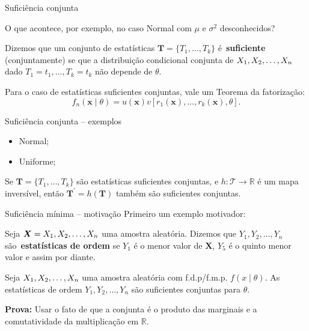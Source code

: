 \begin{frame}{Suficiência conjunta}

O que acontece, por exemplo, no caso Normal com $\mu$ e $\sigma^2$ desconhecidos?

 \begin{defn}
  \label{def:jointly_sufficient}
  Dizemos que  um conjunto de estatísticas $\boldsymbol{T} = \{T_1, \ldots, T_k \}$ é~\textbf{suficiente} (conjuntamente) se que a distribuição condicional conjunta de $X_1, X_2, \ldots, X_n$ dado $T_1 = t_1, \ldots, T_k = t_k$ não depende de $\theta$.  
 \end{defn}
 \begin{obs}
  Para o caso de estatísticas suficientes conjuntas, vale um Teorema da fatorização:
  \begin{equation*}
 f_n(\boldsymbol{x} \mid \theta) = u(\boldsymbol{x}) v[r_1(\boldsymbol{x}), \ldots, r_k(\boldsymbol{x}), \theta].
\end{equation*}
 \end{obs}

\end{frame}

\begin{frame}{Suficiência conjunta -- exemplos}
 \begin{itemize}
  \item Normal;
  \item Uniforme;
 \end{itemize}

  \begin{obs}
    Se $\boldsymbol{T} =  \{T_1, \ldots, T_k \}$ são estatísticas suficientes conjuntas, e $h : \mathcal{T} \to \mathbb{R}$ é um mapa inversível, então $\boldsymbol{T^\prime} = h(\boldsymbol{T})$ também são suficientes conjuntas. 
 \end{obs}
\end{frame}

\begin{frame}{Suficiência mínima -- motivação}
Primeiro um exemplo motivador:
\begin{defn}
 \label{def:order_statistics}
Seja $\boldsymbol{X} = X_1, X_2, \ldots, X_n$ uma amostra aleatória.
Dizemos que $Y_1, Y_2, \ldots, Y_n$ são~\textbf{estatísticas de ordem} se $Y_1$ é o menor valor de $\boldsymbol{X}$, $Y_5$ é o quinto menor valor e assim por diante.
\end{defn}
\begin{theo}
Seja $X_1, X_2, \ldots, X_n$ uma amostra aleatória com f.d.p/f.m.p. $f(x\mid\theta)$.
As estatísticas de ordem $Y_1, Y_2, \ldots, Y_n$ são suficientes conjuntas para $\theta$.
\end{theo}
\textbf{Prova:} Usar o fato de que a conjunta é o produto das marginais e a comutatividade da multiplicação em $\mathbb{R}$. 
\end{frame}

